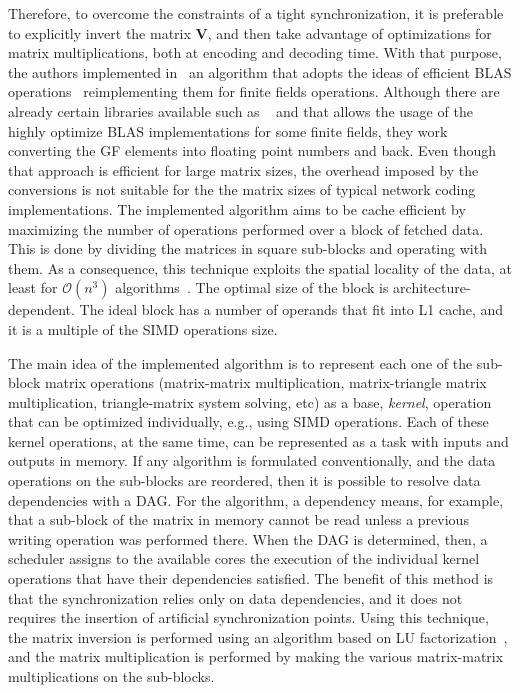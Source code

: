 Therefore, to overcome the constraints of a tight synchronization, it is
preferable to explicitly invert the matrix $\textbf{V}$, and then take advantage
of optimizations for matrix multiplications, both at encoding and decoding time.
With that purpose, the authors implemented in~\cite{wunderlich2015network} an
algorithm that adopts the ideas of efficient \ac{BLAS}
operations~\cite{lawson1979basic} reimplementing them for finite fields
operations. Although there are already certain libraries available such as
~\cite{dumas2008dense} and \cite{dumas2002linbox} that allows the usage of the
highly optimize \ac{BLAS} implementations for some finite fields, they work
converting the GF elements into floating point numbers and back. Even though
that approach is efficient for large matrix sizes, the overhead imposed by the
conversions is not suitable for the the matrix sizes of typical network coding
implementations. The implemented algorithm aims to be cache efficient by
maximizing the number of operations performed over a block of fetched data. This
is done by dividing the matrices in square sub-blocks and operating with them.
As a consequence, this technique exploits the spatial locality of the data, at
least for $\mathcal{O}(n^3)$ algorithms~\cite{golub2012matrix}. The optimal size
of the block is architecture-dependent. The ideal block has a number of operands
that fit into L1 cache, and it is a multiple of the \ac{SIMD} operations size.

The main idea of the implemented algorithm is to represent each one of the sub-
block matrix operations (matrix-matrix multiplication, matrix-triangle matrix
multiplication, triangle-matrix system solving, etc) as a base, \textit{kernel},
operation that can be optimized individually, e.g., using \ac{SIMD} operations.
Each of these kernel operations, at the same time, can be represented as a task
with inputs and outputs in memory. If any algorithm is formulated
conventionally, and the data operations on the sub-blocks are reordered, then it
is possible to resolve data dependencies with a \ac{DAG}. For the algorithm, a
dependency means, for example, that a sub-block of the matrix in memory cannot
be read unless a previous writing operation was performed there. When the
\ac{DAG} is determined, then, a scheduler assigns to the available cores the
execution of the individual kernel operations that have their dependencies
satisfied. The benefit of this method is that the synchronization relies only on
data dependencies, and it does not requires the insertion of artificial
synchronization points. Using this technique, the matrix inversion is performed
using an algorithm based on LU
factorization~\cite{Dongarra:2011:HPM:2132876.2132885}, and the matrix
multiplication is performed by making the various matrix-matrix multiplications
on the sub-blocks.
